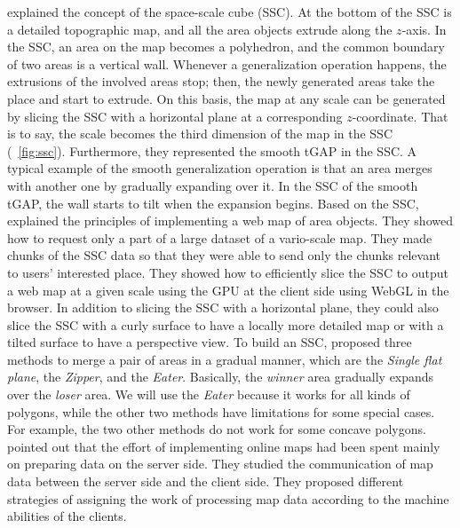 \documentclass[]{interact}
\begin{document}
explained the concept of the space-scale cube (SSC).
At the bottom of the SSC is a detailed topographic map,
and all the area objects extrude along the $z$-axis.
In the SSC, an area on the map becomes a polyhedron, and
the common boundary of two areas is a vertical wall.
Whenever a generalization operation happens, 
the extrusions of the involved areas stop;
then, the newly generated areas take the place and start to extrude.
On this basis, the map at any scale can be generated by slicing the SSC 
with a horizontal plane at a corresponding $z$-coordinate.
That is to say, the scale becomes the third dimension of the map in the SSC
(\eg~\fig\ref{fig:ssc}).
Furthermore, they represented the smooth tGAP in the SSC.
A typical example of the smooth generalization operation is that 
an area merges with another one by gradually expanding over it.
In the SSC of the smooth tGAP, 
the wall starts to tilt when the expansion begins.
Based on the SSC, \citet{Meijers2020Web} explained the principles of 
implementing a web map of area objects.
They showed how to request only a part of a large dataset of a vario-scale map.
They made chunks of the SSC data
so that they were able to send only the chunks relevant 
to users' interested place.
They showed how to efficiently slice the SSC 
to output a web map at a given scale 
using the GPU at the client side using WebGL in the browser.
In addition to slicing the SSC with a horizontal plane,
they could also slice the SSC with a curly surface 
to have a locally more detailed map
or with a tilted surface to have a perspective view.
To build an SSC, \citet{Suba2014Merge} proposed three methods 
to merge a pair of areas in a gradual manner, 
which are the \emph{Single flat plane}, 
the \emph{Zipper}, and the \emph{Eater}.
Basically, the \emph{winner} area gradually expands over the \emph{loser} area.
We will use the \emph{Eater} because it works for all kinds of polygons,
while the other two methods have limitations for some special cases.
For example, the two other methods do not work for some concave polygons.
\citet{Huang2016Webmap} pointed out that
the effort of implementing online maps 
had been spent mainly on preparing data on the server side.
They studied the communication of map data 
between the server side and the client side.
They proposed different strategies of assigning 
the work of processing map data
according to the machine abilities of the clients.
\end{document}
